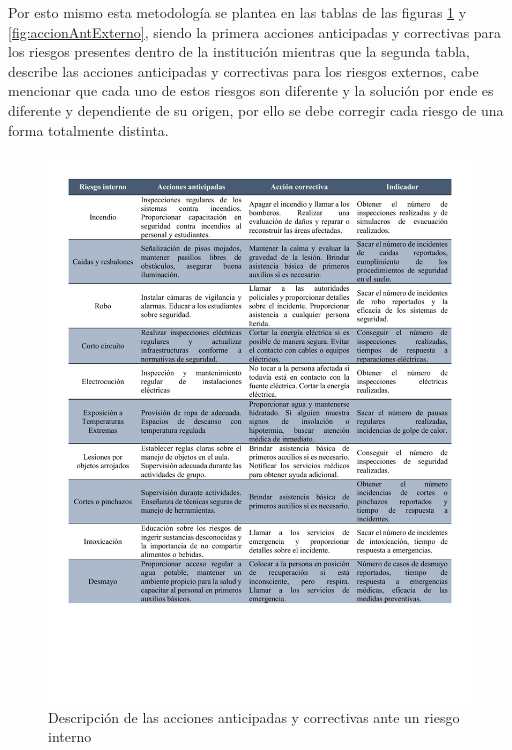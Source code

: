     
    Por esto mismo esta metodología se plantea en las tablas de las figuras \ref{fig:accionAntInterno} y \ref{fig:accionAntExterno}, siendo la primera acciones anticipadas y correctivas para los riesgos presentes dentro de la institución mientras que la segunda tabla, describe las acciones anticipadas y correctivas para los riesgos externos, cabe mencionar que cada uno de estos riesgos son diferente y la solución por ende es diferente y dependiente de su origen, por ello se debe corregir cada riesgo de una forma totalmente distinta.
    
    \begin{figure}[H]
        \centering
        \includegraphics[trim = {10mm 40mm 10mm 10mm},clip,scale=0.41]{22/Img/riesgosInternos2.pdf}
        \caption{Descripción de las acciones anticipadas y correctivas ante un riesgo interno }
        \label{fig:accionAntInterno}
    \end{figure}
    
